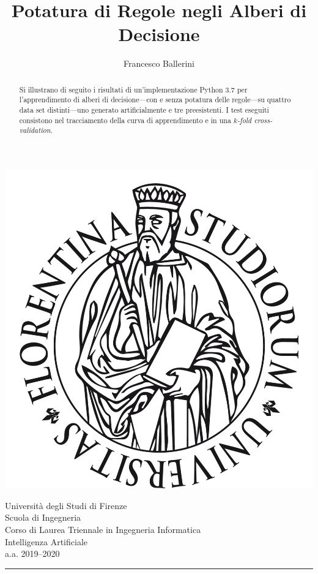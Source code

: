 \documentclass{article}
\title{Potatura di Regole negli Alberi di Decisione}
\author{Francesco Ballerini}
\date{}
\begin{document}
	
	\begin{flushleft}
		\vspace*{-2cm}
		\includegraphics[scale=0.035]{logo.pdf}
		\vspace{-3mm}
	\end{flushleft}
	
	\begin{flushright}
		\footnotesize
		\vspace*{-1.8cm}
		Università degli Studi di Firenze~~ \\
		Scuola di Ingegneria~~ \\
		Corso di Laurea Triennale in Ingegneria Informatica~~ \\
		Intelligenza Artificiale~~ \\
		a.a. 2019--2020~~ \\
		{\rule[1ex]{\textwidth}{0.4pt}}\\
		\vspace{-1cm}
	\end{flushright}
	
	{\let\newpage\relax\maketitle}
	
	\begin{abstract}
		\noindent Si illustrano di seguito i risultati di un'implementazione Python 3.7 per l'apprendimento di alberi di decisione---con e senza potatura delle regole---su quattro data set distinti---uno generato artificialmente e tre preesistenti. I test eseguiti consistono nel tracciamento della curva di apprendimento e in una \emph{$k$-fold cross-validation}.
	\end{abstract}
	
\end{document}
